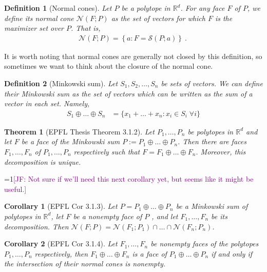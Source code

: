 \documentclass[12pt]{article}
\newcommand{\Comments}{1}
\newcommand{\mynote}[2]{\ifnum\Comments=1\textcolor{#1}{#2}\fi}
\newcommand{\jessie}[1]{\mynote{purple}{[JF: #1]}}
\newcommand{\reals}{\mathbb{R}}
\newcommand{\N}{\mathcal{N}}
\newtheorem{theorem}{Theorem}
\newtheorem{definition}{Definition}
\newtheorem{corollary}{Corollary}
\begin{document}
\begin{definition}[Normal cones]
  Let $P$ be a polytope in $\reals^d$.
  For any face $F$ of $P$, we define its \emph{normal cone} $\N(F;P)$ as the set of vectors for which $F$ is the maximizer set over $P$.
  That is,
  \begin{align*}
    \N(F;P) = \left\{a : F = \mathcal{S}(P; a) \right\}~.~
  \end{align*}
\end{definition}

  It is worth noting that normal cones are generally not closed by this definition, so sometimes we want to think about the closure of the normal cone.

\begin{definition}[Minkowski sum]
	Let $S_1, S_2, \ldots, S_n$ be sets of vectors.
	We can define their \emph{Minkowski sum} as the set of vectors which can be written as the sum of a vector in each set.
	Namely,
	\begin{align*}
	S_1 \oplus \ldots \oplus S_n &= \{x_1 + \ldots + x_n : x_i \in S_i \; \forall i \}
	\end{align*}
\end{definition}

\begin{theorem}[EPFL Thesis Theorem 3.1.2]
	Let $P_1, \ldots, P_n$ be polytopes in $\reals^d$ and let $F$ be a face of the Minkowski sum $P := P_1 \oplus \ldots \oplus P_n$.
	Then there are faces $F_1, \ldots, F_n$ of $P_1, \ldots, P_n$ respectively such that $F = F_1 \oplus \ldots \oplus F_n$.
	Moreover, this decomposition is unique.
\end{theorem}

\jessie{Not sure if we'll need this next corollary yet, but seems like it might be useful.}
\begin{corollary}[EPFL Cor 3.1.3]
  Let $P = P_1 \oplus \ldots \oplus P_n$ be a Minkowski sum of polytopes in $\reals^d$, let $F$ be a nonempty face of $P$ , and let $F_1, \ldots, F_n$ be its decomposition.
  Then $\N(F;P) = \N(F_1;P_1) \cap \ldots \cap \N(F_n; P_n)$.
\end{corollary}

\begin{corollary}[EPFL Cor 3.1.4]
  Let $F_1, \ldots, F_n$ be nonempty faces of the polytopes $P_1, \ldots, P_n$ respectively, then $F_1 \oplus \ldots \oplus F_n$ is a face of $P_1 \oplus \ldots \oplus P_n$ if and only if the intersection of their normal cones is nonempty.
\end{corollary}
\end{document}
